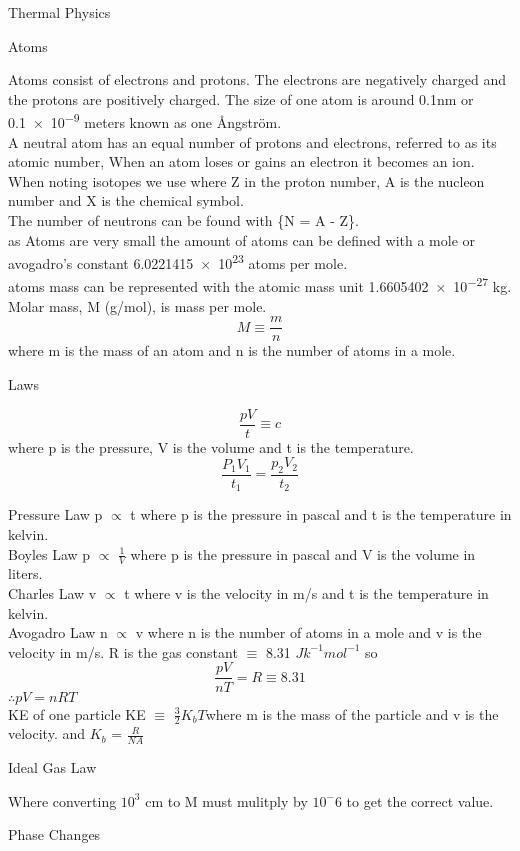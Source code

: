 \documentclass{article}
\newcommand\hr{\par\vspace{-.5\ht\strutbox}\noindent\hrulefill\par}
\newcommand\br{\vspace{0.5cm}}
\begin{document}
\Huge \raggedright Thermal Physics \\ \vspace{1cm}
    \hr
    \LARGE \center Atoms \\
    \br
    
    \raggedright
    \large Atoms consist of electrons and protons. The electrons are negatively charged and the protons are positively charged. The size of one atom is around 0.1nm or \num{0.1e-9} meters known as one Ångström. \\
    \large A neutral atom has an equal number of protons and electrons, referred to as its atomic number, When an atom loses or gains an electron it becomes an ion. When noting isotopes we use  where Z in the proton number, A is the nucleon number and X is the chemical symbol. \\ 
    \large The number of neutrons can be found with \{N = A - Z\}. \\ 
    \large as Atoms are very small the amount of atoms can be defined with a mole or avogadro's constant \num{6.0221415e23} atoms per mole. \\
    \large atoms mass can be represented with the atomic mass unit \num{1.6605402e-27} kg. \\
    \large Molar mass, M (g/mol), is mass per mole. \[M \equiv \frac{m}{n}\] where m is the mass of an atom and n is the number of atoms in a mole. \\




    \hr
    \LARGE \center Laws \\
    \begin{large}
    \[ \frac{pV}{t} \equiv c\] where p is the pressure, V is the volume and t is the temperature. 
    \[\frac{P_1V_1}{t_1} = \frac{p_2V_2}{t_2}\]
    \raggedright
    Pressure Law p $\propto$ t where p is the pressure in pascal and t is the temperature in kelvin. \\
    Boyles Law p $\propto$ $\frac{1}{V}$ where p is the pressure in pascal and V is the volume in liters. \\
    Charles Law v $\propto$ t where v is the velocity in m/s and t is the temperature in kelvin. \\
    Avogadro Law n $\propto$ v where n is the number of atoms in a mole and v is the velocity in m/s. R is the gas constant $\equiv$ 8.31 $Jk^{-1} mol^{-1}$ so \[\frac{pV}{nT} = R \equiv 8.31\] $\therefore pV=nRT$ \\
    KE of one particle KE $\equiv$ $\frac{3}{2}K_bT$where m is the mass of the particle and v is the velocity. and $K_b$ = $\frac{R}{NA}$\\
\end{large}


    \hr
    \LARGE \center Ideal Gas Law \\
    \br 
    \raggedright
    \large Where converting $10^3$ cm to M must mulitply by $10^-6$ to get the correct value. \\



    \hr
    \LARGE \center Phase Changes \\
    \br
    \raggedright

    \hr
\end{document}
